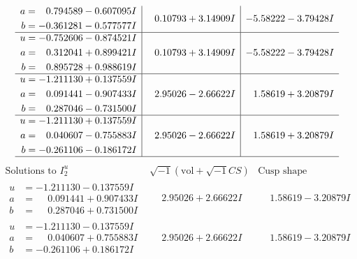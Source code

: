 \documentclass[1p]{elsarticle_modified}
\theoremstyle{definition}
\newcommand{\I}{\sqrt{-1}}
\begin{document}
$$\begin{array}{c|c|c}
\begin{aligned}
a &= \phantom{-}0.794589 - 0.607095 I \\
b &= -0.361281 - 0.577577 I\end{aligned}
 & \phantom{-}0.10793 + 3.14909 I & -5.58222 - 3.79428 I \\ \hline\begin{aligned}
u &= -0.752606 - 0.874521 I \\
a &= \phantom{-}0.312041 + 0.899421 I \\
b &= \phantom{-}0.895728 + 0.988619 I\end{aligned}
 & \phantom{-}0.10793 + 3.14909 I & -5.58222 - 3.79428 I \\ \hline\begin{aligned}
u &= -1.211130 + 0.137559 I \\
a &= \phantom{-}0.091441 - 0.907433 I \\
b &= \phantom{-}0.287046 - 0.731500 I\end{aligned}
 & \phantom{-}2.95026 - 2.66622 I & \phantom{-}1.58619 + 3.20879 I \\ \hline\begin{aligned}
u &= -1.211130 + 0.137559 I \\
a &= \phantom{-}0.040607 - 0.755883 I \\
b &= -0.261106 - 0.186172 I\end{aligned}
 & \phantom{-}2.95026 - 2.66622 I & \phantom{-}1.58619 + 3.20879 I\\
 \hline 
 \end{array}$$\newpage$$\begin{array}{c|c|c}  
\text{Solutions to }I^u_{2}& \I (\text{vol} + \sqrt{-1}CS) & \text{Cusp shape}\\
 \hline 
\begin{aligned}
u &= -1.211130 - 0.137559 I \\
a &= \phantom{-}0.091441 + 0.907433 I \\
b &= \phantom{-}0.287046 + 0.731500 I\end{aligned}
 & \phantom{-}2.95026 + 2.66622 I & \phantom{-}1.58619 - 3.20879 I \\ \hline\begin{aligned}
u &= -1.211130 - 0.137559 I \\
a &= \phantom{-}0.040607 + 0.755883 I \\
b &= -0.261106 + 0.186172 I\end{aligned}
 & \phantom{-}2.95026 + 2.66622 I & \phantom{-}1.58619 - 3.20879 I \\ \hline\begin{aligned}

\end{aligned}
\end{array}$$
\end{document}
